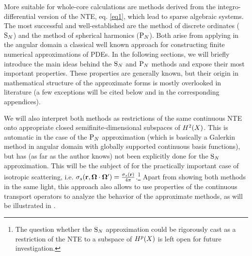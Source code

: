 More suitable for whole-core calculations are methods derived from the integro-differential
version of the NTE, eq.
\eqref{eq1}, which lead to sparse algebraic systems. The most successful and well-established are the method
of discrete ordinates ($\SN$) and the method of spherical harmonics ($\PN$).
Both arise from applying in the
angular domain a classical well known approach for constructing finite numerical
approximations of PDEs.  In the following
sections, we will briefly introduce the main ideas behind the $\SN$ and $\PN$ methods and expose their most
important properties. These properties are generally known, but their origin in mathematical structure of the
approximate forms is mostly overlooked in literature (a few exceptions will be cited below and in the corresponding
appendices). 

We will also interpret both methods as restrictions of the same continuous NTE onto appropriate
closed semifinite-dimensional subspaces of $\Hp[2](X)$. This is automatic in the case of the $\PN$ approximation (which
is basically a Galerkin method in angular domain with globally supported continuous basis functions), but has (as far as the author knows) not been
explicitly done for the $\SN$ approximation. 
This will be the subject of  for the practically
important case of isotropic scattering, i.e. $\sigma_s(\br,\bomega\cdot\bomega') =
\tfrac{\sigma_s(\br)}{4\pi}$.\footnote{The question whether the $\SN$ approximation could be rigorously cast as a
restriction of the NTE to a subspace of $\Hp(X)$ is left open for future investigation.} Apart from showing both
methods in the same light, this approach also allows to use properties of the continuous transport operators to analyze the behavior of the approximate methods, as will 
be illustrated in .  


